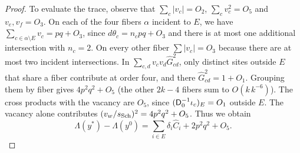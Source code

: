 \begin{proof}
To evaluate the trace, observe that $\sum_c|v_c|=O_2$, $\sum_c v_c^2=O_5$ and $v_e,v_f=O_3$. On
each of the four fibers $\alpha$ incident to $E$, we have $\sum_{c\in\alpha\setminus
E}v_c=pq+O_3$, since $d\theta_c=n_cpq+O_3$ and there is at most one additional intersection with
$n_c=2$. On every other fiber $\sum|v_c|=O_3$ because there are at most two incident
intersections. In $\sum_{c,d}v_cv_d\widehat G_{cd}^2$, only distinct sites outside $E$ that share
a fiber contribute at order four, and there $\widehat G_{cd}^2=1+O_1$. Grouping them by fiber
gives $4p^2q^2+O_5$ (the other $2k-4$ fibers sum to $O(k\,k^{-6})$). The cross products with the
vacancy are $O_5$, since $(\mathsf D_0^{-1}\iota_c)_E=O_1$ outside $E$. The vacancy alone
contributes $(v_w/s_{\mathrm{Sch}})^2=4p^2q^2+O_5$. Thus we obtain
\[
 \Lambda(y^*)-\Lambda(y^0)=\sum_{i\in E}\delta_i\widehat C_i+2p^2q^2+O_5 .
\]
\end{proof}
